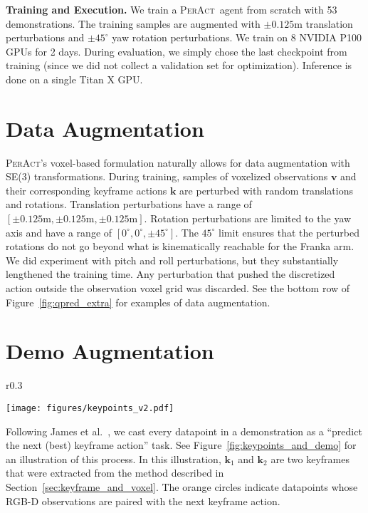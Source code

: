 \documentclass{article}
\newcommand{\secref}[1]{Section~\ref{#1}}
\newcommand{\figref}[1]{Figure~\ref{#1}}
\newcommand{\model}{\textsc{PerAct}}
\begin{document}
\textbf{Training and Execution.} We train a \model~agent from scratch with 53 demonstrations. The training samples are augmented with $\pm0.125$m translation perturbations and $\pm45^\circ$ yaw rotation perturbations. We train on 8 NVIDIA P100 GPUs for 2 days. During evaluation, we simply chose the last checkpoint from training (since we did not collect a validation set for optimization). Inference is   done on a single Titan X GPU. 


\newpage
\vspace{-1cm}
\section{Data Augmentation} \label{app:data_aug}
\model's voxel-based formulation naturally allows for data augmentation with SE(3) transformations. During training, samples of voxelized observations $\mathbf{v}$ and their corresponding keyframe actions $\mathbf{k}$ are perturbed with random translations and rotations. Translation perturbations have a range of $[\pm0.125\textrm{m}, \pm0.125\textrm{m}, \pm0.125\textrm{m}]$. Rotation perturbations are limited to the yaw axis and have a range of $[0^{\circ}, 0^{\circ}, \pm45^{\circ}]$. The $45^{\circ}$ limit ensures that the perturbed rotations do not go beyond what is kinematically reachable for the Franka arm. We did experiment with pitch and roll perturbations, but they substantially lengthened the training time. Any perturbation that pushed the discretized action outside the observation voxel grid was discarded. See the bottom row of \figref{fig:qpred_extra} for examples of data augmentation. 




\section{Demo Augmentation} \label{app:keypoints_and_demo}
\begin{wrapfigure}[7]{r}{0.3\textwidth}
  \vspace{-2cm}
  \begin{center}
  \hspace{1cm}
    \texttt{[image: figures/keypoints\_v2.pdf]}
  \caption{\textbf{Keyframes and Demo Augmentation.}}
  \label{fig:keypoints_and_demo}
  \end{center}
  \vspace{-12cm}
\end{wrapfigure}
Following James et al.~\citep{james2020rlbench}, we cast every datapoint in a demonstration as a ``predict the next (best) keyframe action'' task. See \figref{fig:keypoints_and_demo} for an illustration of this process. In this illustration, $\mathbf{k}_{1}$ and $\mathbf{k}_{2}$ are two keyframes that were extracted from the method described in \secref{sec:keyframe_and_voxel}. The orange circles indicate datapoints whose RGB-D observations are paired with the next keyframe action. 
\end{document}
